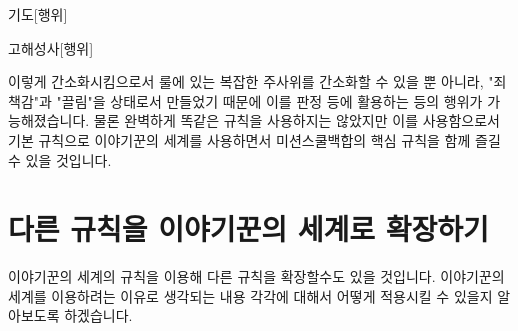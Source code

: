 \documentclass{report}
\begin{document}
	\begin{story}{기도}{[행위]}
		
		
	\end{story}
	
	\begin{story}{고해성사}{[행위]}
		
		
	\end{story}
	
	이렇게 간소화시킴으로서 룰에 있는 복잡한 주사위를 간소화할 수 있을 뿐 아니라, "죄책감"과 "끌림"을 상태로서 만들었기 때문에 이를 판정 등에 활용하는 등의 행위가 가능해졌습니다. 물론 완벽하게 똑같은 규칙을 사용하지는 않았지만 이를 사용함으로서 기본 규칙으로 이야기꾼의 세계를 사용하면서 미션스쿨백합의 핵심 규칙을 함께 즐길 수 있을 것입니다.
	
	\iffalse
	또 다른 예시로 Call of Cthulhu의 경우에는 다음 이야기를 역할로 부여할 수 있을 것입니다:
	\begin{story}{점점 미쳐가는 이야기}{[세계][설화][광기]}
		\entry{이성치 100을 얻는다. 일반적으로 이해할 수 없는 일(살인, 시체, 고대의 존재 등)을 목격할때마다, 그 수준에 따라 난이도와 피해량(성공/실패, 다이스 사용 가능)을 시스템이 지정한다. 그러면 1d(현재 이성치)를 굴려, 해당 수치가 난이도 이상이라면 이성치에 성공 피해량을, 미만이라면 실패 피해량을 받는다. (e.g. 60[1d4/2d8]의 경우 주사위의 결과가 60 이상이 나오면 성공하며, 성공시 1d4 정신력, 실패시 2d8 정신력을 잃는다.)}
		
		\entry[\hline]{현재 이성치의 10\% 이상에 달하는 피해를 한번에 받은 이야기꾼은 해당 상황에 대한 이 시나리오에서의 [기피]를, 20\% 이상인 경우 이 시나리오에서의 [공포]를 얻는다. 25\% 이상인 경우, [공포]를 얻는 것은 같으나 이는 시나리오에서 벗어나도 유지된다. 이를 방지하기 위해 이성치에 받는 피해의 전부 또는 일부를 1대1의 비율로 정신력에 받을 수 있다.}
	\end{story}
	\fi
	
	\section*{다른 규칙을 이야기꾼의 세계로 확장하기}
	이야기꾼의 세계의 규칙을 이용해 다른 규칙을 확장할수도 있을 것입니다. 이야기꾼의 세계를 이용하려는 이유로 생각되는 내용 각각에 대해서 어떻게 적용시킬 수 있을지 알아보도록 하겠습니다.
	
\end{document}
